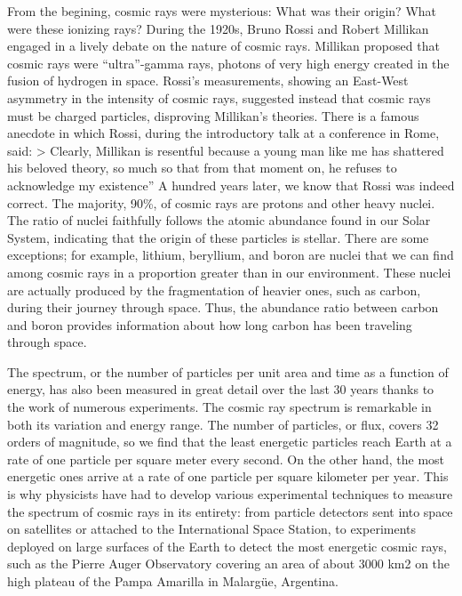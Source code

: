 \documentclass[
  letterpaper,
  DIV=11,
  numbers=noendperiod]{scrreprt}
\begin{document}
From the begining, cosmic rays were mysterious: What was their origin?
What were these ionizing rays? During the 1920s, Bruno Rossi and Robert
Millikan engaged in a lively debate on the nature of cosmic rays.
Millikan proposed that cosmic rays were ``ultra''-gamma rays, photons of
very high energy created in the fusion of hydrogen in space. Rossi's
measurements, showing an East-West asymmetry in the intensity of cosmic
rays, suggested instead that cosmic rays must be charged particles,
disproving Millikan's theories. There is a famous anecdote in which
Rossi, during the introductory talk at a conference in Rome, said:
\textgreater{} Clearly, Millikan is resentful because a young man like
me has shattered his beloved theory, so much so that from that moment
on, he refuses to acknowledge my existence'' A hundred years later, we
know that Rossi was indeed correct. The majority, 90\%, of cosmic rays
are protons and other heavy nuclei. The ratio of nuclei faithfully
follows the atomic abundance found in our Solar System, indicating that
the origin of these particles is stellar. There are some exceptions; for
example, lithium, beryllium, and boron are nuclei that we can find among
cosmic rays in a proportion greater than in our environment. These
nuclei are actually produced by the fragmentation of heavier ones, such
as carbon, during their journey through space. Thus, the abundance ratio
between carbon and boron provides information about how long carbon has
been traveling through space.

The spectrum, or the number of particles per unit area and time as a
function of energy, has also been measured in great detail over the last
30 years thanks to the work of numerous experiments. The cosmic ray
spectrum is remarkable in both its variation and energy range. The
number of particles, or flux, covers 32 orders of magnitude, so we find
that the least energetic particles reach Earth at a rate of one particle
per square meter every second. On the other hand, the most energetic
ones arrive at a rate of one particle per square kilometer per year.
This is why physicists have had to develop various experimental
techniques to measure the spectrum of cosmic rays in its entirety: from
particle detectors sent into space on satellites or attached to the
International Space Station, to experiments deployed on large surfaces
of the Earth to detect the most energetic cosmic rays, such as the
Pierre Auger Observatory covering an area of about 3000 km2 on the high
plateau of the Pampa Amarilla in Malargüe, Argentina.
\end{document}
